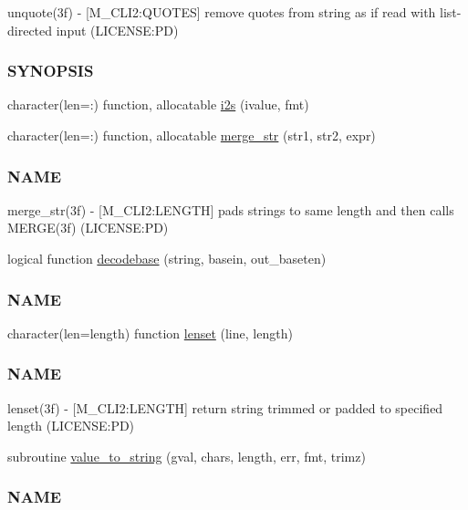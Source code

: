 \begin{DoxyCompactItemize}
\begin{DoxyCompactList}
unquote(3f) -\/ \mbox{[}M\+\_\+\+C\+L\+I2\+:Q\+U\+O\+T\+ES\mbox{]} remove quotes from string as if read with list-\/directed input (L\+I\+C\+E\+N\+SE\+:PD) \subsubsection*{S\+Y\+N\+O\+P\+S\+IS}\end{DoxyCompactList}\item 
character(len=\+:) function, allocatable \mbox{\hyperlink{namespacem__cli2_aa106d3533fd6d4845f0b3e94b2a79ffb}{i2s}} (ivalue, fmt)
\item 
character(len=\+:) function, allocatable \mbox{\hyperlink{namespacem__cli2_a8e172feb2e4ae4d21d4fceb4e54f593c}{merge\+\_\+str}} (str1, str2, expr)
\begin{DoxyCompactList}\small\item\em \subsubsection*{N\+A\+ME}

merge\+\_\+str(3f) -\/ \mbox{[}M\+\_\+\+C\+L\+I2\+:L\+E\+N\+G\+TH\mbox{]} pads strings to same length and then calls M\+E\+R\+G\+E(3f) (L\+I\+C\+E\+N\+SE\+:PD) \end{DoxyCompactList}\item 
logical function \mbox{\hyperlink{namespacem__cli2_a1029304d495b2bf791e03cfab5983bbb}{decodebase}} (string, basein, out\+\_\+baseten)
\begin{DoxyCompactList}\small\item\em \subsubsection*{N\+A\+ME}\end{DoxyCompactList}\item 
character(len=length) function \mbox{\hyperlink{namespacem__cli2_ad13853611abfee00d40ffa020662ec8a}{lenset}} (line, length)
\begin{DoxyCompactList}\small\item\em \subsubsection*{N\+A\+ME}

lenset(3f) -\/ \mbox{[}M\+\_\+\+C\+L\+I2\+:L\+E\+N\+G\+TH\mbox{]} return string trimmed or padded to specified length (L\+I\+C\+E\+N\+SE\+:PD) \end{DoxyCompactList}\item 
subroutine \mbox{\hyperlink{namespacem__cli2_a1bbcefd886dabb0286e2cb14ab54034f}{value\+\_\+to\+\_\+string}} (gval, chars, length, err, fmt, trimz)
\begin{DoxyCompactList}\small\item\em \subsubsection*{N\+A\+ME}


\end{DoxyCompactList}
\end{DoxyCompactItemize}
